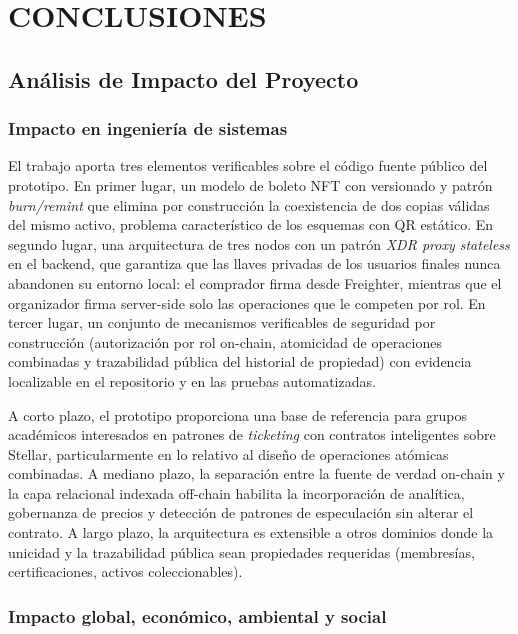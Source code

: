 \newpage
\setcounter{subsection}{0}
\section{CONCLUSIONES}

\subsection{Análisis de Impacto del Proyecto}

\subsubsection{Impacto en ingeniería de sistemas}

El trabajo aporta tres elementos verificables sobre el código fuente público del prototipo. En primer lugar,
un modelo de boleto NFT con versionado y patrón \textit{burn/remint} que elimina por construcción la
coexistencia de dos copias válidas del mismo activo, problema característico de los esquemas con QR estático.
En segundo lugar, una arquitectura de tres nodos con un patrón \textit{XDR proxy stateless} en el backend,
que garantiza que las llaves privadas de los usuarios finales nunca abandonen su entorno local: el comprador
firma desde Freighter, mientras que el organizador firma server-side solo las operaciones que le competen por
rol. En tercer lugar, un conjunto de mecanismos verificables de seguridad por construcción (autorización por
rol on-chain, atomicidad de operaciones combinadas y trazabilidad pública del historial de propiedad) con
evidencia localizable en el repositorio y en las pruebas automatizadas.

A corto plazo, el prototipo proporciona una base de referencia para grupos académicos interesados en patrones
de \textit{ticketing} con contratos inteligentes sobre Stellar, particularmente en lo relativo al diseño de
operaciones atómicas combinadas. A mediano plazo, la separación entre la fuente de verdad on-chain y la capa
relacional indexada off-chain habilita la incorporación de analítica, gobernanza de precios y detección de
patrones de especulación sin alterar el contrato. A largo plazo, la arquitectura es extensible a otros
dominios donde la unicidad y la trazabilidad pública sean propiedades requeridas (membresías,
certificaciones, activos coleccionables).

\subsubsection{Impacto global, económico, ambiental y social}

